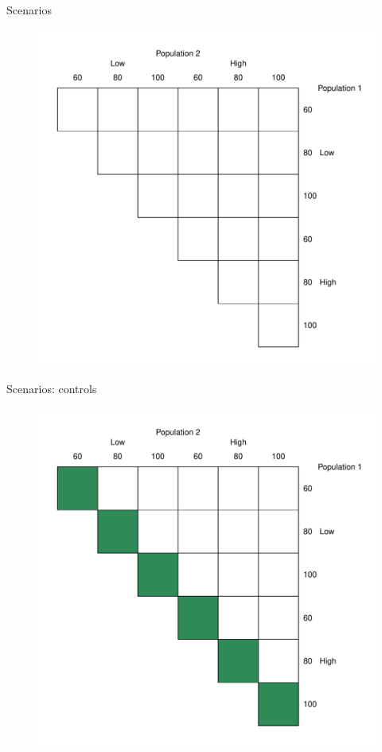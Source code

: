 \documentclass{beamer}
\begin{document}
\begin{withoutheadline}
\begin{frame}{Scenarios}
  \begin{figure}
  \flushright
    \includegraphics[width=.7\textwidth]{scenario0}
  \end{figure}
\end{frame}
\end{withoutheadline}

\begin{withoutheadline}
\begin{frame}{Scenarios: controls}
  \begin{figure}
  \flushright
    \includegraphics[width=.7\textwidth]{scenario1}
  \end{figure}
\end{frame}
\end{withoutheadline}
\end{document}
